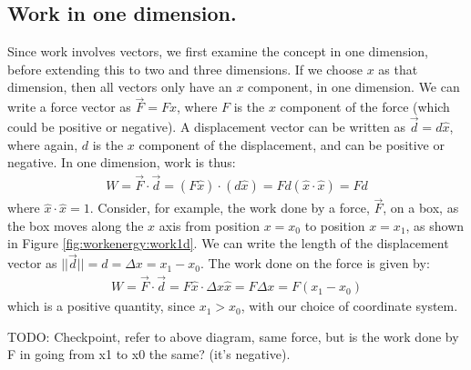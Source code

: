 \subsection{Work in one dimension.}
Since work involves vectors, we first examine the concept in one dimension, before extending this to two and three dimensions. If we choose $x$ as that dimension, then all vectors only have an $x$ component, in one dimension. We can write a force vector as $\vec F=F\hat x$, where $F$ is the $x$ component of the force (which could be positive or negative). A displacement vector can be written as $\vec d = d \hat x$, where again, $d$ is the $x$ component of the displacement, and can be positive or negative. In one dimension, work is thus:
\begin{align*}
W = \vec F \cdot \vec d = (F\hat x) \cdot ( d\hat x ) = Fd (\hat x\cdot\hat x)=Fd
\end{align*}
where $\hat x \cdot \hat x = 1$. Consider, for example, the work done by a force, $\vec F$, on a box, as the box moves along the $x$ axis from position $x=x_0$ to position $x=x_1$, as shown in Figure \ref{fig:workenergy:work1d}.
We can write the length of the displacement vector as $||\vec d|| =d= \Delta x = x_1-x_0$. The work done on the force is given by:
\begin{align*}
W = \vec F \cdot \vec d = F\hat x\cdot \Delta x\hat x =F\Delta x =F(x_1-x_0) 
\end{align*}
which is a positive quantity, since $x_1 > x_0$, with our choice of coordinate system. 

TODO: Checkpoint, refer to above diagram, same force, but is the work done by F in going from x1 to x0 the same? (it's negative). 


